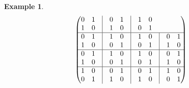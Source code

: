 \documentclass[a4paper,11pt]{article}
\theoremstyle{mystyle}
\newtheorem{exmp}{Example}
\begin{document}
\begin{exmp}
\begin{align*}
\begin{pmatrix}
\begin{matrix}
0 & 1\\
1 & 0
\end{matrix} & \vline &
\begin{matrix}
0 & 1\\
1 & 0
\end{matrix} & \vline &
\begin{matrix}
1 & 0\\
0 & 1
\end{matrix} \\ \hline
\begin{matrix}
0 & 1\\
1 & 0
\end{matrix} & \vline &
\begin{matrix}
1 & 0\\
0 & 1
\end{matrix} & \vline &
\begin{matrix}
1 & 0\\
0 & 1
\end{matrix} & \vline &
\begin{matrix}
0 & 1\\
1 & 0
\end{matrix}\\ \hline
\begin{matrix}
0 & 1\\
1 & 0
\end{matrix} & \vline &
\begin{matrix}
1 & 0\\
0 & 1
\end{matrix} & \vline &
\begin{matrix}
1 & 0\\
0 & 1
\end{matrix} & \vline &
\begin{matrix}
0 & 1\\
1 & 0
\end{matrix}\\ \hline
\begin{matrix}
1 & 0\\
0 & 1
\end{matrix} & \vline &
\begin{matrix}
0 & 1\\
1 & 0
\end{matrix} & \vline &
\begin{matrix}
0 & 1\\
1 & 0
\end{matrix} & \vline &
\begin{matrix}
1 & 0\\
0 & 1
\end{matrix}
\end{pmatrix}
\end{align*}
\end{exmp}
\end{document}
